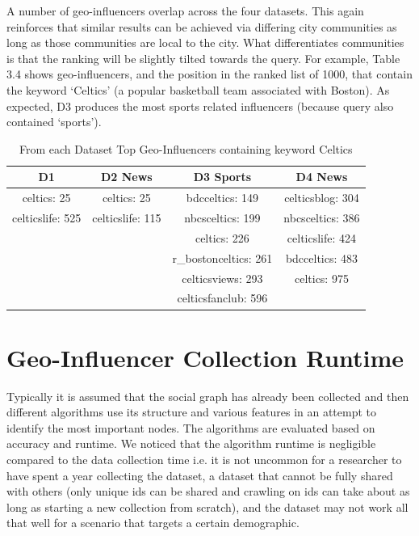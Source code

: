A number of geo-influencers overlap across the four datasets. This again reinforces that similar results can be achieved via differing city communities as long as those communities are local to the city. What differentiates communities is that the ranking will be slightly tilted towards the query. For example, Table 3.4 shows geo-influencers, and the position in the ranked list of 1000, that contain the keyword `Celtics' (a popular basketball team associated with Boston). As expected, D3 produces the most sports related influencers (because query also contained `sports').

\begin{table}
\small
\renewcommand{\arraystretch}{1.2}
\caption{From each Dataset Top Geo-Influencers containing keyword Celtics}
\label{table_ch4_4}
\centering
\tabcolsep=0.13cm
\begin{tabular}{|c|c|c|c|}
\hline
\bfseries D1&\bfseries D2 News&\bfseries D3 Sports&\bfseries D4 News\\
\hline
celtics: 25&celtics: 25&bdcceltics: 149&celticsblog: 304\\
\hline
celticslife: 525&celticslife: 115&nbcsceltics: 199&nbcsceltics: 386\\
\hline
&&celtics: 226&celticslife: 424\\
\hline
&&r\_bostonceltics: 261&bdcceltics: 483\\
\hline
&&celticsviews: 293&celtics: 975\\
\hline
&&celticsfanclub: 596&\\
\hline
\end{tabular}
\end{table}

\section{Geo-Influencer Collection Runtime}

Typically it is assumed that the social graph has already been collected and then different algorithms use its structure and various features in an attempt to identify the most important nodes. The algorithms are evaluated based on accuracy and runtime. We noticed that the algorithm runtime is negligible compared to the data collection time i.e. it is not uncommon for a researcher to have spent a year collecting the dataset, a dataset that cannot be fully shared with others (only unique ids can be shared and crawling on ids can take about as long as starting a new collection from scratch), and the dataset may not work all that well for a scenario that targets a certain demographic.

